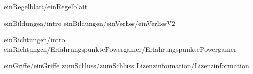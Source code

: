 
 {einRegelblatt/einRegelblatt}

 {einBildungen/intro}
 {einBildungen/einVerlies/einVerliesV2}

 {einRichtungen/intro}
 {einRichtungen/ErfahrungspunktePowergamer/ErfahrungspunktePowergamer}

 {einGriffe/einGriffe}
 {zumSchluss/zumSchluss}
 {Lizenzinformation/Lizenzinformation}

